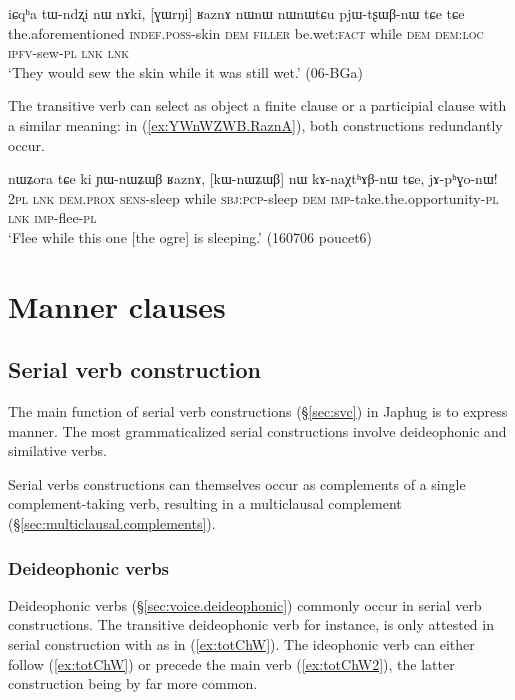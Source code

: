 \begin{exe}
\ex \label{ex:GWrNi.RaznA}
\gll iɕqʰa tɯ-ndʐi nɯ nɤki, [ɣɯrŋi] ʁaznɤ nɯnɯ nɯnɯtɕu pjɯ-tʂɯβ-nɯ tɕe tɕe \\
the.aforementioned \textsc{indef}.\textsc{poss}-skin \textsc{dem} \textsc{filler} be.wet:\textsc{fact} while \textsc{dem} \textsc{dem}:\textsc{loc} \textsc{ipfv}-sew-\textsc{pl} \textsc{lnk} \textsc{lnk} \\
\glt `They would sew the skin while it was still wet.' (06-BGa)
\end{exe}

The transitive verb  can select as object a finite clause or a participial clause with a similar meaning: in  (\ref{ex:YWnWZWB.RaznA}), both constructions redundantly occur. 

\begin{exe}
\ex \label{ex:YWnWZWB.RaznA}
\gll  nɯʑora tɕe ki ɲɯ-nɯʑɯβ ʁaznɤ, [kɯ-nɯʑɯβ] nɯ kɤ-naχtʰɤβ-nɯ tɕe, jɤ-pʰɣo-nɯ! \\
\textsc{2pl} \textsc{lnk} \textsc{dem}.\textsc{prox} \textsc{sens}-sleep while \textsc{sbj}:\textsc{pcp}-sleep \textsc{dem} \textsc{imp}-take.the.opportunity-\textsc{pl} \textsc{lnk} \textsc{imp}-flee-\textsc{pl} \\
\glt `Flee while this one [the ogre] is sleeping.' (160706 poucet6)
\end{exe}
 


\section{Manner clauses} \label{sec:manner.clauses}

\subsection{Serial verb construction} \label{sec:svc.manner}
The main function of serial verb constructions (§\ref{sec:svc}) in Japhug is to express manner. The most grammaticalized serial constructions involve deideophonic and similative verbs.


Serial verbs constructions can themselves occur as complements of a single com\-ple\-ment-taking verb, resulting in a multiclausal complement (§\ref{sec:multiclausal.complements}).

\subsubsection{Deideophonic verbs} \label{sec:svc.deideophonic}
Deideophonic verbs (§\ref{sec:voice.deideophonic}) commonly occur in serial verb constructions. The transitive deideophonic verb  for instance, is only attested in serial construction with  as in (\ref{ex:totChW}). The ideophonic verb can either follow (\ref{ex:totChW}) or precede the main verb (\ref{ex:totChW2}), the latter construction being by far more common. 

